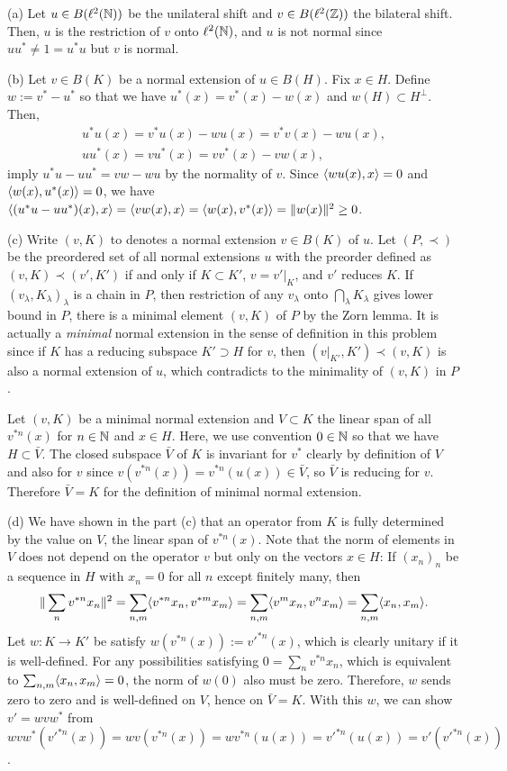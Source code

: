 \documentclass{../../small}
\begin{document}
\begin{sol}
(a)
Let $u\in B(\ell^2(\mathbb{N}))$ be the unilateral shift and $v\in B(\ell^2(\mathbb{Z}))$ the bilateral shift.
Then, $u$ is the restriction of $v$ onto $\ell^2(\mathbb{N})$, and $u$ is not normal since $uu^*\ne1=u^*u$ but $v$ is normal.

(b)
Let $v\in B(K)$ be a normal extension of $u\in B(H)$.
Fix $x\in H$.
Define $w:=v^*-u^*$ so that we have $u^*(x)=v^*(x)-w(x)$ and $w(H)\subset H^\perp$.
Then,
\begin{gather*}
u^*u(x)=v^*u(x)-wu(x)=v^*v(x)-wu(x),\\
uu^*(x)=vu^*(x)=vv^*(x)-vw(x),
\end{gather*}
imply $u^*u-uu^*=vw-wu$ by the normality of $v$.
Since $\langle wu(x),x\rangle=0$ and $\langle w(x),u^*(x)\rangle=0$, we have $\langle(u^*u-uu^*)(x),x\rangle=\langle vw(x),x\rangle=\langle w(x),v^*(x)\rangle=\|w(x)\|^2\ge0$.

(c)
Write $(v,K)$ to denotes a normal extension $v\in B(K)$ of $u$.
Let $(P,\prec)$ be the preordered set of all normal extensions $u$ with the preorder defined as $(v,K)\prec(v',K')$ if and only if $K\subset K'$, $v=v'|_K$, and $v'$ reduces $K$.
If $(v_\lambda,K_\lambda)_\lambda$ is a chain in $P$, then restriction of any $v_\lambda$ onto $\bigcap_\lambda K_\lambda$ gives lower bound in $P$, there is a minimal element $(v,K)$ of $P$ by the Zorn lemma.
It is actually a \emph{minimal} normal extension in the sense of definition in this problem since if $K$ has a reducing subspace $K'\supset H$ for $v$, then $(v|_{K'},K')\prec(v,K)$ is also a normal extension of $u$, which contradicts to the minimality of $(v,K)$ in $P$.

Let $(v,K)$ be a minimal normal extension and $V\subset K$ the linear span of all $v^{*n}(x)$ for $n\in\mathbb{N}$ and $x\in H$.
Here, we use convention $0\in\mathbb{N}$ so that we have $H\subset\bar V$.
The closed subspace $\bar V$ of $K$ is invariant for $v^*$ clearly by definition of $V$ and also for $v$ since $v(v^{*n}(x))=v^{*n}(u(x))\in \bar V$, so $\bar V$ is reducing for $v$.
Therefore $\bar V=K$ for the definition of minimal normal extension.

(d)
We have shown in the part (c) that an operator from $K$ is fully determined by the value on $V$, the linear span of $v^{*n}(x)$.
Note that the norm of elements in $V$ does not depend on the operator $v$ but only on the vectors $x\in H$:
If $(x_n)_n$ be a sequence in $H$ with $x_n=0$ for all $n$ except finitely many, then
\[\|\sum_n v^{*n}x_n\|^2
=\sum_{n,m}\langle v^{*n}x_n,v^{*m}x_m\rangle
=\sum_{n,m}\langle v^mx_n,v^nx_m\rangle
=\sum_{n,m}\langle x_n,x_m\rangle.\]
Let $w:K\to K'$ be satisfy $w(v^{*n}(x)):=v'^{*n}(x)$, which is clearly unitary if it is well-defined.
For any possibilities satisfying $0=\sum_nv^{*n}x_n$, which is equivalent to $\sum_{n,m}\langle x_n,x_m\rangle=0$, the norm of $w(0)$ also must be zero.
Therefore, $w$ sends zero to zero and is well-defined on $V$, hence on $\bar V=K$.
With this $w$, we can show $v'=wvw^*$ from $wvw^*(v'^{*n}(x))=wv(v^{*n}(x))=wv^{*n}(u(x))=v'^{*n}(u(x))=v'(v'^{*n}(x))$.
\end{sol}
\end{document}
